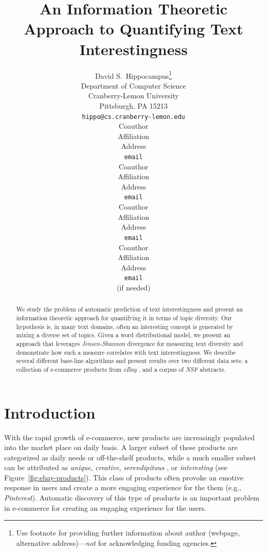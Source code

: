 \documentclass{article} %
\title{An Information Theoretic Approach to Quantifying Text Interestingness}
\author{
David S.~Hippocampus\thanks{ Use footnote for providing further information
about author (webpage, alternative address)---\emph{not} for acknowledging
funding agencies.} \\
Department of Computer Science\\
Cranberry-Lemon University\\
Pittsburgh, PA 15213 \\
\texttt{hippo@cs.cranberry-lemon.edu} \\
\And
Coauthor \\
Affiliation \\
Address \\
\texttt{email} \\
\AND
Coauthor \\
Affiliation \\
Address \\
\texttt{email} \\
\And
Coauthor \\
Affiliation \\
Address \\
\texttt{email} \\
\And
Coauthor \\
Affiliation \\
Address \\
\texttt{email} \\
(if needed)\\
}
\begin{document}
\maketitle

\begin{abstract}

We study the problem of automatic prediction of text interestingness and present an information theoretic approach for
quantifying it in terms of topic diversity. Our hypothesis is, in many text domains, often an interesting
concept is generated by mixing a diverse set of topics. Given a word distributional model, we present
an approach that leverages {\sl Jensen-Shannon} divergence for measuring text diversity and demonstrate how such a measure
correlates with text interestingness. We describe several different base-line algorithms and present results over two different
data sets: a collection of e-commerce products from {\sl eBay} , and a corpus of {\sl NSF} abstracts.
\end{abstract}



\section{Introduction}
\label{sec:introduction}

With the rapid growth of e-commerce, new products are increasingly populated into the market place on daily basis.  A larger subset of these products are 
categorized as daily needs or off-the-shelf products, while a much smaller subset can be attributed as {\em unique}, {\em creative}, {\em serendipitous }, or {\em interesting} (see Figure~\ref{fig:ebay-products}). This class of products often provoke an emotive response in users and create a more engaging experience for the them (e.g.,  {\em Pinterest}). Automatic discovery of this type of products is an important problem in e-commerce for creating an engaging experience for the users.  
\end{document}
